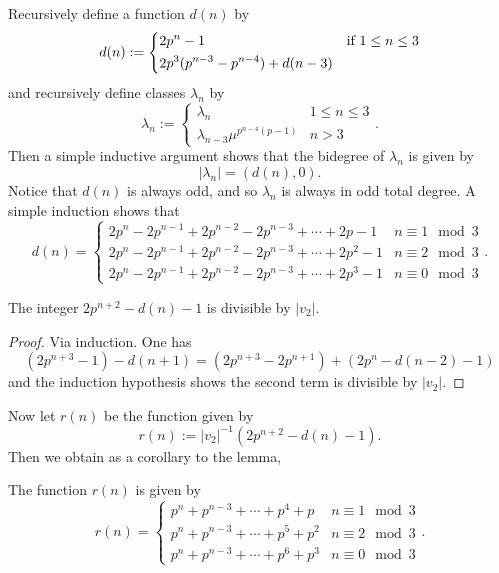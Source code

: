 Recursively define a function $d(n)$ by 
\[
d(n):= 
\begin{dcases*}
	2p^n-1 & if $1\leq n \leq 3$\\
	2p^3(p^{n-3}-p^{n-4}) + d(n-3)
\end{dcases*}
\]
and recursively define classes $\lambda_n$ by 
\[
\lambda_n:= \begin{cases}
	\lambda_n & 1\leq n \leq 3\\
	\lambda_{n-3}\mu^{p^{n-4}(p-1)} & n>3
\end{cases}.
\]
Then a simple inductive argument shows that the bidegree of $\lambda_n$ is given by
\begin{equation}
	|\lambda_n| = (d(n),0). 
\end{equation}
Notice that $d(n)$ is always odd, and so $\lambda_n$ is always in odd total degree. A simple induction shows that 
\[
d(n)=
\begin{cases}
	2p^n-2p^{n-1}+2p^{n-2}-2p^{n-3}+\cdots + 2p-1 & n\equiv 1 \mod 3\\
	2p^n-2p^{n-1}+2p^{n-2}-2p^{n-3}+\cdots + 2p^2-1 & n\equiv 2 \mod 3\\
	2p^n-2p^{n-1}+2p^{n-2}-2p^{n-3}+\cdots + 2p^3-1 & n\equiv 0 \mod 3
\end{cases}.
\]

\begin{lem}\label{lem:v2divisibility}
	The integer $2p^{n+2}-d(n)-1$ is divisible by $|v_2|$.
\end{lem}
\begin{proof}
	Via induction. One has 
	\[
	(2p^{n+3}-1)-d(n+1) = (2p^{n+3}-2p^{n+1}) + (2p^{n}-d(n-2)-1)
	\]
	and the induction hypothesis shows the second term is divisible by $|v_2|$. 
\end{proof}

Now let $r(n)$ be the function given by 
\[
r(n):= |v_2|^{-1}(2p^{n+2}-d(n)-1).
\]
Then we obtain as a corollary to the lemma, 
\begin{cor}
The function $r(n)$ is given by 
\[
r(n) = \begin{cases}
	p^n+p^{n-3}+ \cdots +p^4+p & n\equiv 1 \mod 3\\
	p^n+p^{n-3}+ \cdots + p^5+p^2 & n\equiv 2 \mod 3\\
	p^n+p^{n-3}+ \cdots +p^6+ p^3 & n\equiv 0 \mod 3
\end{cases}.
\]	
\end{cor}

